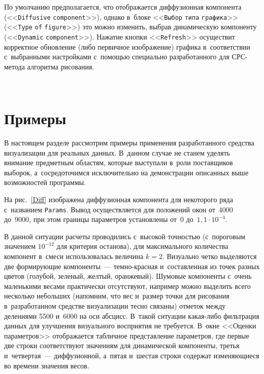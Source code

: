 \begin{multicols}{2}
По умолчанию предполагается, что отоб\-ра\-жа\-ет\-ся диффузионная компонента
(<<\verb"Diffusive" \verb"component">>), однако в~блоке <<\verb"Выбор"
\verb"типа" \verb"графика">>
(<<\verb"Type" \verb"of" \verb"figure">>) это можно изменить, выбрав динамическую компоненту
(<<\verb"Dynamic" \verb"component">>). Нажатие кнопки <<\verb"Refresh">> осуществит корректное обновление
(либо первичное изображение) графика в~соответствии с~выбранными настройками с~по\-мощью специально
разработанного для СРС-ме\-то\-да алгоритма рисования.

\begin{figure*} %
\vspace*{1pt}
 \begin{center}
 \mbox{%
 \epsfxsize=160mm
 }
 \end{center}
 \vspace*{-10pt}
\vspace*{-3pt}
\end{figure*}

\vspace*{-6pt}

\section{Примеры}

\vspace*{-2pt}

В настоящем разделе рассмотрим примеры применения разработанного средства визуализации для реальных
данных. В~данном случае не станем уделять внимание предметным областям, которые выступали в~роли
поставщиков выборок, а~сосредоточимся исключительно на демонстрации описанных выше возможностей
программы.

На рис.~\ref{Diff} изображена диффузионная компонента для некоторого ряда с~названием \verb"Params".
Вывод осуществляется для положений окон от~4000 до~9000,
при этом границы параметров установлены
от~0 до~$1{,}1\cdot10^{-4}$.



В данной ситуации расчеты проводились с~высокой точностью
(с~пороговым значением $10^{-12}$ для
критерия останова), для максимального количества компонент в~смеси использовалась величина $k=2$.
Визуально четко выделяются две фор\-ми\-ру\-ющие компоненты~---
тем\-но-крас\-ная и~составленная из точек разных
цветов (голубой, зеленый, желтый, оранжевый). Шумовые компоненты с~очень маленькими весами
практически отсутствуют, например можно выделить всего несколько небольших (напомним, что вес и~размер точки для рисования в~разработанном средстве визуализации тесно связаны) отметок между
делениями 5500 и~6000 на оси абсцисс. В~такой ситуации какая-либо фильтрация данных для улучшения
визуального восприятия не требуется. В~окне <<Оценки параметров>> отображается табличное
представление параметров, где первые две строки соответствуют значениям для динамической компоненты,
третья и~четвертая~--- диффузионной, а~пятая и~шестая строки содержат изменяющиеся во времени значения
весов.


\end{multicols}
